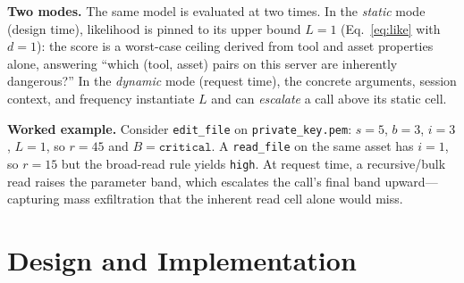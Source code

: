 \documentclass[conference]{IEEEtran}
\begin{document}
\noindent\textbf{Two modes.} The same model is evaluated at two times. In the
\emph{static} mode (design time), likelihood is pinned to its upper bound
$L{=}1$ (Eq.~\ref{eq:like} with $d{=}1$): the score is a worst-case ceiling
derived from tool and asset properties alone, answering ``which (tool, asset)
pairs on this server are inherently dangerous?'' In the \emph{dynamic} mode
(request time), the concrete arguments, session context, and frequency
instantiate $L$ and can \emph{escalate} a call above its static cell.

\noindent\textbf{Worked example.} Consider \texttt{edit\_file} on
\texttt{private\_key.pem}: $s{=}5$, $b{=}3$, $i{=}3$, $L{=}1$, so $r{=}45$ and
$B{=}\texttt{critical}$. A \texttt{read\_file} on the same asset has $i{=}1$, so
$r{=}15$ but the broad-read rule yields \texttt{high}. At request time, a
recursive/bulk read raises the parameter band, which escalates the call's final
band upward---capturing mass exfiltration that the inherent read cell alone would
miss.

\section{Design and Implementation}
\label{sec:design}
\end{document}
